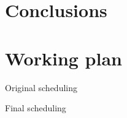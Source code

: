 

\section{Conclusions}

\section{Working plan}
\begin{frame}{Original scheduling}
\centering
\vspace{1.4em}
\scalebox{0.25}{%

}
\end{frame}

\begin{frame}{Final scheduling}
\centering
\vspace{1.4em}
\scalebox{0.25}{

}
\end{frame}








%
%
%
%
%
%
%

%
%
%
%
%
%
%
%
%
%
%
%
%
%
%


